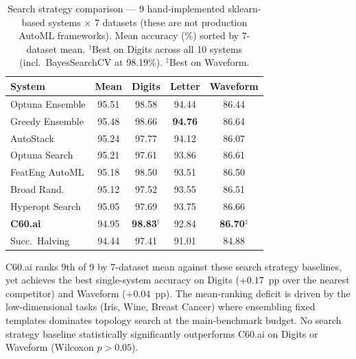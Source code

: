 \documentclass{article}
\theoremstyle{definition}
\theoremstyle{plain}
\theoremstyle{remark}
\newcommand{\sys}[1]{\textbf{\textcolor{c60blue}{#1}}}
\begin{document}
\begin{table}[t]
  \caption{%
    Search strategy comparison — 9 hand-implemented sklearn-based systems
    $\times$ 7 datasets (these are not production AutoML frameworks).
    Mean accuracy (\%) sorted by 7-dataset mean.
    $^\dagger$Best on Digits across all 10 systems (incl.\ BayesSearchCV
    at 98.19\%).
    $^\ddagger$Best on Waveform.%
  }
  \label{tab:automl}
  \vskip 0.05in
  \begin{center}
    \begin{small}
      \begin{tabular}{lcccc}
        \toprule
        System             & Mean   & Digits              & Letter         & Waveform \\
        \midrule
        Optuna Ensemble    & 95.51  & 98.58               & 94.44          & 86.44 \\
        Greedy Ensemble    & 95.48  & 98.66               & \textbf{94.76} & 86.64 \\
        AutoStack          & 95.24  & 97.77               & 94.12          & 86.07 \\
        Optuna Search      & 95.21  & 97.61               & 93.86          & 86.61 \\
        FeatEng AutoML     & 95.18  & 98.50               & 93.51          & 86.50 \\
        Broad Rand.        & 95.12  & 97.52               & 93.55          & 86.51 \\
        Hyperopt Search    & 95.05  & 97.69               & 93.75          & 86.66 \\
        \sys{C60.ai}       & 94.95  & \sys{98.83}$^\dagger$ & 92.84       & \sys{86.70}$^\ddagger$ \\
        Succ.\ Halving     & 94.44  & 97.41               & 91.01          & 84.88 \\
        \bottomrule
      \end{tabular}
    \end{small}
  \end{center}
  \vskip -0.1in
\end{table}

C60.ai ranks 9th of 9 by 7-dataset mean against these search strategy
baselines, yet achieves the best single-system accuracy on Digits
($+0.17$~pp over the nearest competitor) and Waveform ($+0.04$~pp).
The mean-ranking deficit is driven by the low-dimensional tasks (Iris,
Wine, Breast Cancer) where ensembling fixed templates dominates
topology search at the main-benchmark budget.
No search strategy baseline statistically significantly outperforms
C60.ai on Digits or Waveform (Wilcoxon $p > 0.05$).
\end{document}
